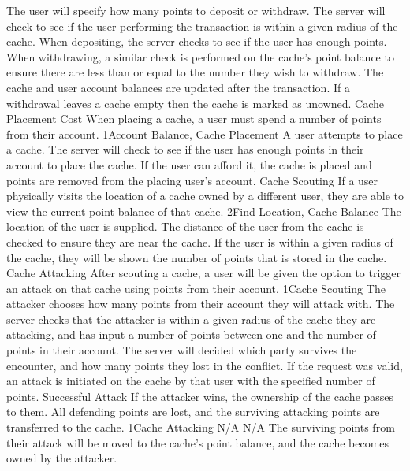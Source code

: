 			{The user will specify how many points to deposit or withdraw.}
			{The server will check to see if the user performing the 
			transaction is within a given radius of the cache. When 
			depositing, the server checks to see if the user has enough points.
			When withdrawing, a similar check is performed on the cache's 
			point balance to ensure there are less than or equal to the number 
			they wish to withdraw.}
			{The cache and user account balances are updated after the 
			transaction. If a withdrawal leaves a cache empty then the cache 
			is marked as unowned.}
		\funcreq
			{Cache Placement Cost}
			{When placing a cache, a user must spend a number of points from 
			their account.}
			{1}{Account Balance, Cache Placement}
			{A user attempts to place a cache.}
			{The server will check to see if the user has enough points in 
			their account to place the cache.}
			{If the user can afford it, the cache is placed and points are 
			removed from the placing user's account.}
		\funcreq
			{Cache Scouting}
			{If a user physically visits the location of a cache owned by a 
			different user, they are able to view the current point balance of 
			that cache.}
			{2}{Find Location, Cache Balance}
			{The location of the user is supplied.}
			{The distance of the user from the cache is checked to ensure they 
			are near the cache.}
			{If the user is within a given radius of the cache, they will be 
			shown the number of points that is stored in the cache.}
		\funcreq
			{Cache Attacking}
			{After scouting a cache, a user will be given the option to 
			trigger an attack on that cache using points from their account.}
			{1}{Cache Scouting}
			{The attacker chooses how many points from their account they will 
			attack with.}
			{The server checks that the attacker is within a given radius of 
			the cache they are attacking, and has input a number of points 
			between one and the number of points in their account. The server 
			will decided which party survives the encounter, and how many 
			points they lost in the conflict.}
			{If the request was valid, an attack is initiated on the cache by 
			that user with the specified number of points.}
		\funcreq
			{Successful Attack}
			{If the attacker wins, the ownership of the cache passes to them. 
			All defending points are lost, and the surviving attacking points 
			are transferred to the cache.}
			{1}{Cache Attacking}
			{N/A}
			{N/A}
			{The surviving points from their attack will be moved to the 
			cache's point balance, and the cache becomes owned by the attacker.
			}
		\funcreq
